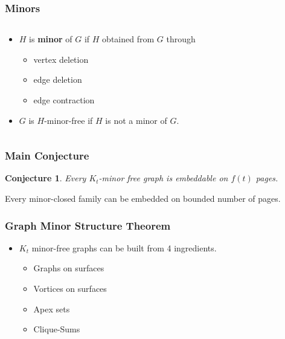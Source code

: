 \documentclass{beamer}
\newtheorem{conjecture}{Conjecture}
\begin{document}
\begin{frame}
    \frametitle{Minors}
    \begin{columns}
      \begin{column}{0.5\textwidth}
          \begin{itemize}
            \item $H$ is \textbf{minor} of $G$ if $H$ obtained from $G$ through \begin{itemize}
              \item vertex deletion
              \item edge deletion
              \item edge contraction
            \end{itemize}
            \item $G$ is $H$-minor-free if $H$ is not a minor of $G$. 
          \end{itemize}    
      \end{column}
        \begin{column}{0.5\textwidth}
          \begin{figure}
            \centering
            
          \end{figure}
      \end{column}
    \end{columns}
\end{frame}

\begin{frame}
  \frametitle{Main Conjecture}
  \begin{conjecture}
  Every $K_t$-minor free graph is embeddable on $f(t)$ pages.
  \end{conjecture}
	
  \begin{corollary}
    Every minor-closed family can be embedded on bounded number of pages.
  \end{corollary}
\end{frame}

\begin{frame}
    \frametitle{Graph Minor Structure Theorem}
    \begin{itemize}
      \item $K_t$ minor-free graphs can be built from 4 ingredients. \begin{itemize}
        \item Graphs on surfaces
        \item Vortices on surfaces
        \item Apex sets
        \item Clique-Sums
      \end{itemize}
    \end{itemize}
\end{frame}
\end{document}
